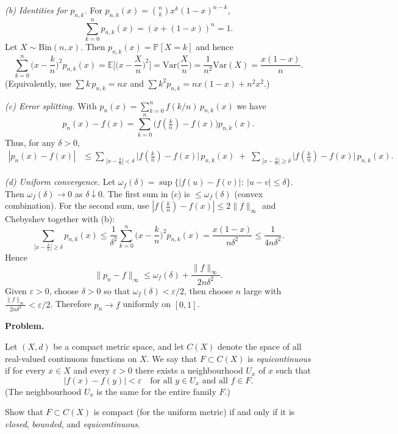 \documentclass[12pt,a4paper]{article}
\begin{document}
	\medskip
	\emph{(b) Identities for $p_{n,k}$.}
	For $p_{n,k}(x)=\binom{n}{k}x^k(1-x)^{n-k}$,
	\[
	\sum_{k=0}^{n} p_{n,k}(x)=(x+(1-x))^n=1.
	\]
	Let $X\sim\mathrm{Bin}(n,x)$. Then $p_{n,k}(x)=\mathbb P[X=k]$ and hence
	\[
	\sum_{k=0}^{n}\Big(x-\frac{k}{n}\Big)^{2}p_{n,k}(x)
	=\mathbb E\Big[\Big(x-\frac{X}{n}\Big)^2\Big]
	=\mathrm{Var}\!\Big(\frac{X}{n}\Big)
	=\frac{1}{n^2}\mathrm{Var}(X)
	=\frac{x(1-x)}{n}.
	\]
	(Equivalently, use $\sum k\,p_{n,k}=nx$ and $\sum k^2p_{n,k}=n x(1-x)+n^2x^2$.)
	
	\medskip
	\emph{(c) Error splitting.}
	With $p_n(x)=\sum_{k=0}^{n} f(k/n)\,p_{n,k}(x)$ we have
	\[
	p_n(x)-f(x)=\sum_{k=0}^{n}\big(f(\tfrac{k}{n})-f(x)\big)p_{n,k}(x).
	\]
	Thus, for any $\delta>0$,
	\[
	\begin{aligned}
		|p_n(x)-f(x)|
		&\le
		\sum_{\;|x-\frac{k}{n}|<\delta}\! \bigl|f(\tfrac{k}{n})-f(x)\bigr|\,p_{n,k}(x)
		\;+\;
		\sum_{\;|x-\frac{k}{n}|\ge \delta}\! \bigl|f(\tfrac{k}{n})-f(x)\bigr|\,p_{n,k}(x).
	\end{aligned}
	\]
	
	\medskip
	\emph{(d) Uniform convergence.}
	Let $\omega_f(\delta)=\sup\{|f(u)-f(v)|:\ |u-v|\le\delta\}$.
	Then $\omega_f(\delta)\to0$ as $\delta\downarrow0$.
	The first sum in (c) is $\le \omega_f(\delta)$ (convex combination).
	For the second sum, use $|f(\tfrac{k}{n})-f(x)|\le 2\|f\|_\infty$ and Chebyshev together with (b):
	\[
	\sum_{|x-\frac{k}{n}|\ge\delta} p_{n,k}(x)
	\le \frac{1}{\delta^2}\sum_{k=0}^{n}\Big(x-\frac{k}{n}\Big)^2 p_{n,k}(x)
	= \frac{x(1-x)}{n\delta^2}
	\le \frac{1}{4n\delta^2}.
	\]
	Hence
	\[
	\|p_n-f\|_\infty \le \omega_f(\delta) + \frac{\|f\|_\infty}{2n\delta^2}.
	\]
	Given $\varepsilon>0$, choose $\delta>0$ so that $\omega_f(\delta)<\varepsilon/2$,
	then choose $n$ large with $\frac{\|f\|_\infty}{2n\delta^2}<\varepsilon/2$.
	Therefore $p_n\to f$ uniformly on $[0,1]$.
	
	
	\textbf{Problem.}
	
	Let $(X,d)$ be a compact metric space, and let $C(X)$ denote the space of all real-valued continuous functions on $X$.
	We say that $F\subset C(X)$ is \emph{equicontinuous} if for every $x\in X$ and every $\varepsilon>0$ there exists a neighbourhood $U_x$ of $x$ such that
	\[
	|f(x)-f(y)|<\varepsilon \quad \text{for all } y\in U_x \text{ and all } f\in F.
	\]
	(The neighbourhood $U_x$ is the same for the entire family $F$.)
	
	Show that $F\subset C(X)$ is compact (for the uniform metric) if and only if it is \emph{closed}, \emph{bounded}, and \emph{equicontinuous}.
	
\end{document}
